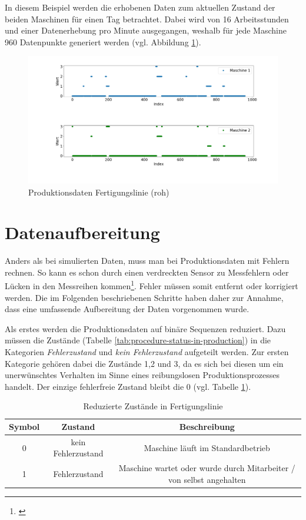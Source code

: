 In diesem Beispiel werden die erhobenen Daten zum aktuellen Zustand der beiden Maschinen für einen Tag betrachtet. Dabei wird von 16 Arbeitsstunden und einer Datenerhebung pro Minute ausgegangen, weshalb für jede Maschine 960 Datenpunkte generiert werden (vgl. Abbildung \ref{fig:procedure-raw-data}).

\begin{figure}[H]
	\centering
	\includegraphics[scale=0.32]{images/procedure/raw-data}
	\caption{Produktionsdaten Fertigungslinie (roh)}
	\label{fig:procedure-raw-data}
\end{figure}

\section{Datenaufbereitung}
Anders als bei simulierten Daten, muss man bei Produktionsdaten mit Fehlern rechnen. So kann es schon durch einen verdreckten Sensor zu Messfehlern oder Lücken in den Messreihen kommen\footnote{ \cite{DataMining2015}}. Fehler müssen somit entfernt oder korrigiert werden. Die im Folgenden beschriebenen Schritte haben daher zur Annahme, dass eine umfassende Aufbereitung der Daten vorgenommen wurde.

Als erstes werden die Produktionsdaten auf binäre Sequenzen reduziert. Dazu müssen die Zustände (Tabelle \ref{tab:procedure-status-in-production}) in die Kategorien \textit{Fehlerzustand} und \textit{kein Fehlerzustand} aufgeteilt werden. Zur ersten Kategorie gehören dabei die Zustände 1,2 und 3, da es sich bei diesen um ein unerwünschtes Verhalten im Sinne eines reibungslosen Produktionsprozesses handelt. Der einzige fehlerfreie Zustand bleibt die 0 (vgl. Tabelle \ref{tab:procedure-reduced-status-in-production}).

\begin{table}
	\begin{center}
		\begin{tabular}{|c c c|} 
			\hline
			Symbol & Zustand & Beschreibung \\
			\hline\hline
			0 & kein Fehlerzustand & Maschine läuft im Standardbetrieb \\ 
			\hline
			1 & Fehlerzustand & Maschine wartet oder wurde durch Mitarbeiter / von selbst angehalten  \\
			\hline
		\end{tabular}
		\caption{Reduzierte Zustände in Fertigungslinie}
		\label{tab:procedure-reduced-status-in-production}
	\end{center}
\end{table}

